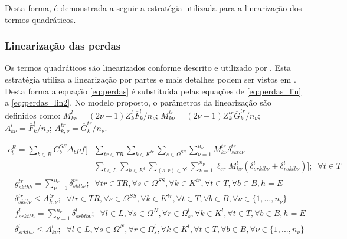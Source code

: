 Desta forma, é demonstrada  a seguir a estratégia utilizada para a linearização dos termos quadráticos. 

\subsubsection*{Linearização das perdas}

Os termos quadráticos são linearizados conforme descrito e utilizado por . Esta estratégia utiliza a linearização por partes e mais detalhes podem ser vistos em . Desta forma a equação \eqref{eq:perdas} é substituída pelas equações de \eqref{eq:perdas_lin} a \eqref{eq:perdas_lin2}. No modelo proposto, o parâmetros da linearização são definidos como: $M^{l}_{k\nu} = (2\nu - 1)Z^l_k \overline{F}^l_k/n_\nu$; $M^{tr}_{k\nu} = (2\nu - 1)Z^{tr}_k\overline{G}^{tr}_k/n_\nu$; $ A^l_{k\nu} = \overline{F}^l_k/n_\nu$; $A^{tr}_{k,\nu} = \overline{G}^{tr}_k/n_\nu$.

\begin{align}
 c^R_t  =
   \sum_{b \in B} C^{SS}_b \Delta_b pf \bigg[&\sum_{tr \in TR} \sum_{k \in K^{tr}} \sum_{s \in \Omega^{SS}}
   \sum_{\nu = 1}^{n_\nu}
   M^{tr}_{k\nu} \delta^{tr}_{sktb\nu} +\nonumber \\
    &\sum_{l \in L} \sum_{k \in K^l} \sum_{(s, r) \in \Upsilon^l}
    \sum_{\nu = 1}^{n_\nu}
    \ell_{sr}M^{l}_{k\nu} (\delta^l_{srktb\nu} + \delta^l_{rsktb\nu})
    \bigg]; \; \; \forall t \in T
    \label{eq:perdas_lin}
\end{align}
\begin{align}
    &g^{tr}_{sktbh} = \sum_{\nu = 1}^{n_\nu}\delta^{tr}_{sktb\nu}; \; \; \forall tr \in TR, \forall s \in \Omega^{SS}, \forall k \in K^{tr}, \forall t \in T, \forall b \in B, h=E\\
    &\delta^{tr}_{sktb\nu} \leq A^{tr}_{k,\nu}; \; \; \forall tr \in TR, \forall s \in \Omega^{SS}, \forall k \in K^{tr}, \forall t \in T, \forall b \in B, \forall \nu \in \{1,...,n_\nu\}\\
    &f^l_{srktbh} = \sum_{\nu = 1}^{n_\nu}\delta^l_{srktb\nu}; \; \;\forall l \in L, \forall s \in \Omega^N, \forall r \in \Omega^l_s, \forall k \in K^l, \forall t \in T, \forall b \in B, h=E\\
    &\delta^l_{srktb\nu} \leq A^l_{k\nu}; \; \;\forall l \in L, \forall s \in \Omega^N, \forall r \in \Omega^l_s, \forall k \in K^l, \forall t \in T, \forall b \in B , \forall \nu \in \{1,...,n_\nu\}
    \label{eq:perdas_lin2}
\end{align}

